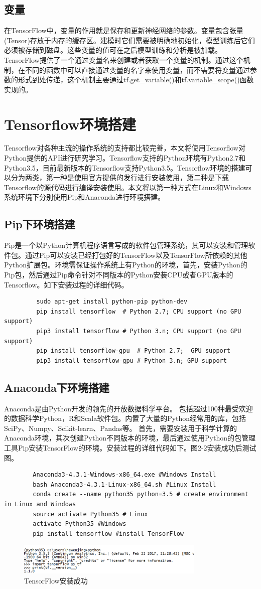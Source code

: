 		\subsection{变量}
		在TensorFlow中，变量的作用就是保存和更新神经网络的参数。变量包含张量 (Tensor)存放于内存的缓存区。建模时它们需要被明确地初始化，模型训练后它们必须被存储到磁盘。这些变量的值可在之后模型训练和分析是被加载。 TensorFlow提供了一个通过变量名来创建或者获取一个变量的机制。通过这个机制，在不同的函数中可以直接通过变量的名字来使用变量，而不需要将变量通过参数的形式到处传递，这个机制主要通过tf.get\_variable()和tf.variable\_scope()函数实现的。
	\section{Tensorflow环境搭建}
	Tensorflow对各种主流的操作系统的支持都比较完善，本文将使用Tensorflow对Python提供的API进行研究学习。Tensorflow支持的Python环境有Python2.7和Python3.5，目前最新版本的Tensorflow支持Python3.5。Tensorflow环境的搭建可以分为两类，第一种是使用官方提供的发行进行安装使用，第二种是下载Tensorflow的源代码进行编译安装使用。本文将以第一种方式在Linux和Windows系统环境下分别使用Pip和Anaconda进行环境搭建。
		\subsection{Pip下环境搭建}
		Pip是一个以Python计算机程序语言写成的软件包管理系统，其可以安装和管理软件包。通过Pip可以安装已经打包好的TensorFlow以及TensorFlow所依赖的其他Python扩展包。环境需保证操作系统上有Python的环境，首先，安装Python的Pip包，然后通过Pip命令针对不同版本的Python安装CPU或者GPU版本的Tensorflow。如下安装过程的详细代码。
		\begin{lstlisting}
		 sudo apt-get install python-pip python-dev
		 pip install tensorflow  # Python 2.7; CPU support (no GPU support)
		 pip3 install tensorflow # Python 3.n; CPU support (no GPU support)
		 pip install tensorflow-gpu  # Python 2.7;  GPU support
		 pip3 install tensorflow-gpu # Python 3.n; GPU support
		\end{lstlisting}
		\subsection{Anaconda下环境搭建}
		Anaconda是由Python开发的领先的开放数据科学平台。 包括超过100种最受欢迎的数据科学Python，R和Scala软件包。内置了大量的Python经常用的库，包括SciPy、Numpy、Scikit-learn、Pandas等。 首先，需要安装用于科学计算的Anaconda环境，其次创建Python不同版本的环境，最后通过使用Python的包管理工具Pip安装TensorFlow的环境。安装过程的详细代码如下。图2-2安装成功后测试图。
		\begin{lstlisting}
		Anaconda3-4.3.1-Windows-x86_64.exe #Windows Install
		bash Anaconda3-4.3.1-Linux-x86_64.sh #Linux Install
		conda create --name python35 python=3.5 # create environment in Linux and Windows
		source activate Python35 # Linux
		activate Python35 #Windows
		pip install tensorflow #install TensorFlow
		\end{lstlisting}
		
		\begin{figure}[!ht]
			\centering
			\includegraphics[width=0.8\textwidth]{figures/2-3}
			\caption{TensorFlow安装成功}
			\label{fig:2-3}
		\end{figure}